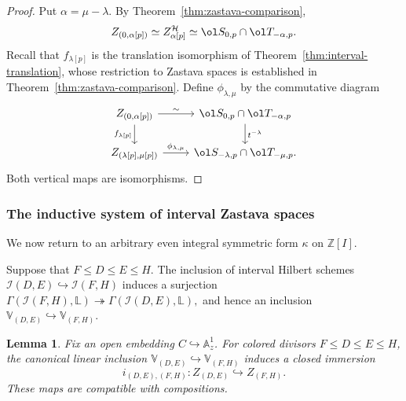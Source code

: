 \documentclass{amsart}
\numberwithin{equation}{section}
\numberwithin{figure}{section}
\newtheorem{lem}[thm]{Lemma}
\theoremstyle{definition}
\theoremstyle{remark}
\renewcommand{\c}[1]{\mathcal{#1}}
\renewcommand{\b}[1]{\mathbb{#1}}
\begin{document}
\begin{proof}
	Put $\alpha=\mu-\lambda$.
	By Theorem~\ref{thm:zastava-comparison},
	\[
	Z_{(0,\alpha[p])}
	\simeq
	Z^{\c H}_{\alpha[p]}
	\simeq
	\ol S_{0,p}\cap\ol T_{-\alpha,p}.
	\]
	Recall that $f_{\lambda[p]}$ is the translation
	isomorphism of Theorem~\ref{thm:interval-translation},
	whose restriction to Zastava spaces is established
	in Theorem~\ref{thm:zastava-comparison}.
	Define $\phi_{\lambda,\mu}$ by the commutative diagram
	\[
	\begin{tikzcd}
		Z_{(0,\alpha[p])}
		\arrow[r,"\sim"]
		\arrow[d,"f_{\lambda[p]}"']
		&
		\ol S_{0,p}\cap\ol T_{-\alpha,p}
		\arrow[d,"t^{-\lambda}"]
		\\
		Z_{(\lambda[p],\mu[p])}
		\arrow[r,"\phi_{\lambda,\mu}"]
		&
		\ol S_{-\lambda,p}\cap\ol T_{-\mu,p}.
	\end{tikzcd}
	\]
	Both vertical maps are isomorphisms.
\end{proof}





\subsubsection{The inductive system of interval Zastava spaces}
\label{subsec:interval-inductive-system}

We now return to an arbitrary even integral symmetric
form $\kappa$ on $\b Z[I]$.

Suppose that $F\leq D\leq E\leq H.$ The inclusion of interval Hilbert schemes $\c I(D,E)\hookrightarrow\c I(F,H)$
induces a surjection $\Gamma(\c I(F,H),\b L)
\twoheadrightarrow
\Gamma(\c I(D,E),\b L),$
and hence an inclusion
$\b V_{(D,E)}\hookrightarrow\b V_{(F,H)}.$

\begin{lem}
	\label{lem:interval-transition}
	Fix an open embedding $C\hookrightarrow\b A^1_z$.
	For colored divisors $F\leq D\leq E\leq H$, the
	canonical linear inclusion
	$\b V_{(D,E)}\hookrightarrow\b V_{(F,H)}$
	induces a closed immersion
	\[
	i_{(D,E),(F,H)}:
	Z_{(D,E)}\hookrightarrow Z_{(F,H)}.
	\]
	These maps are compatible with compositions.
\end{lem}
\end{document}
